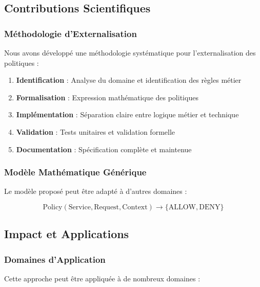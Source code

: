 \documentclass[12pt,a4paper]{article}
\begin{document}
    \subsection{Contributions Scientifiques}

    \subsubsection{Méthodologie d'Externalisation}

    Nous avons développé une méthodologie systématique pour l'externalisation des politiques :

    \begin{enumerate}
        \item \textbf{Identification} : Analyse du domaine et identification des règles métier
        \item \textbf{Formalisation} : Expression mathématique des politiques
        \item \textbf{Implémentation} : Séparation claire entre logique métier et technique
        \item \textbf{Validation} : Tests unitaires et validation formelle
        \item \textbf{Documentation} : Spécification complète et maintenue
    \end{enumerate}

    \subsubsection{Modèle Mathématique Générique}

    Le modèle proposé peut être adapté à d'autres domaines :

    \begin{equation}
        \text{Policy}(\text{Service}, \text{Request}, \text{Context}) \rightarrow \{\text{ALLOW}, \text{DENY}\}
    \end{equation}

    \subsection{Impact et Applications}

    \subsubsection{Domaines d'Application}

    Cette approche peut être appliquée à de nombreux domaines :
\end{document}

